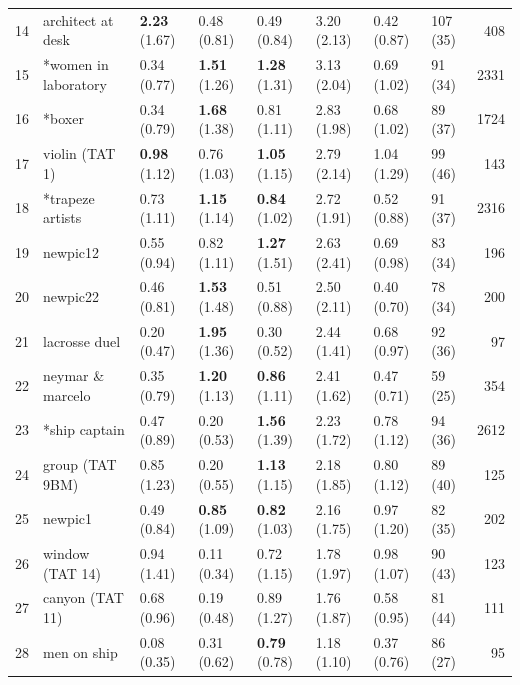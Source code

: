 \documentclass[jou,a4paper]{apa6}\usepackage[]{graphicx}\usepackage[]{color}
\begin{document}
\begin{table}
\begin{threeparttable}
\begin{tabularx}{\textwidth}{rlllllllr}
   14 & architect at desk & \textbf{2.23} (1.67) & 0.48 (0.81) & 0.49 (0.84) & 3.20 (2.13) & 0.42 (0.87) & 107 (35) & 408 \\ 
   15 & *women in laboratory & 0.34 (0.77) & \textbf{1.51} (1.26) & \textbf{1.28} (1.31) & 3.13 (2.04) & 0.69 (1.02) & 91 (34) & 2331 \\ 
   16 & *boxer & 0.34 (0.79) & \textbf{1.68} (1.38) & 0.81 (1.11) & 2.83 (1.98) & 0.68 (1.02) & 89 (37) & 1724 \\ 
   17 & violin (TAT 1) & \textbf{0.98} (1.12) & 0.76 (1.03) & \textbf{1.05} (1.15) & 2.79 (2.14) & 1.04 (1.29) & 99 (46) & 143 \\ 
   18 & *trapeze artists & 0.73 (1.11) & \textbf{1.15} (1.14) & \textbf{0.84} (1.02) & 2.72 (1.91) & 0.52 (0.88) & 91 (37) & 2316 \\ 
   19 & newpic12 & 0.55 (0.94) & 0.82 (1.11) & \textbf{1.27} (1.51) & 2.63 (2.41) & 0.69 (0.98) & 83 (34) & 196 \\ 
   20 & newpic22 & 0.46 (0.81) & \textbf{1.53} (1.48) & 0.51 (0.88) & 2.50 (2.11) & 0.40 (0.70) & 78 (34) & 200 \\ 
   21 & lacrosse duel & 0.20 (0.47) & \textbf{1.95} (1.36) & 0.30 (0.52) & 2.44 (1.41) & 0.68 (0.97) & 92 (36) &  97 \\ 
   22 & neymar \& marcelo & 0.35 (0.79) & \textbf{1.20} (1.13) & \textbf{0.86} (1.11) & 2.41 (1.62) & 0.47 (0.71) & 59 (25) & 354 \\ 
   23 & *ship captain & 0.47 (0.89) & 0.20 (0.53) & \textbf{1.56} (1.39) & 2.23 (1.72) & 0.78 (1.12) & 94 (36) & 2612 \\ 
   24 & group (TAT 9BM) & 0.85 (1.23) & 0.20 (0.55) & \textbf{1.13} (1.15) & 2.18 (1.85) & 0.80 (1.12) & 89 (40) & 125 \\ 
   25 & newpic1 & 0.49 (0.84) & \textbf{0.85} (1.09) & \textbf{0.82} (1.03) & 2.16 (1.75) & 0.97 (1.20) & 82 (35) & 202 \\ 
   26 & window (TAT 14) & 0.94 (1.41) & 0.11 (0.34) & 0.72 (1.15) & 1.78 (1.97) & 0.98 (1.07) & 90 (43) & 123 \\ 
   27 & canyon (TAT 11) & 0.68 (0.96) & 0.19 (0.48) & 0.89 (1.27) & 1.76 (1.87) & 0.58 (0.95) & 81 (44) & 111 \\ 
   28 & men on ship & 0.08 (0.35) & 0.31 (0.62) & \textbf{0.79} (0.78) & 1.18 (1.10) & 0.37 (0.76) & 86 (27) &  95 \\ 
   \hline


\end{tabularx}
\end{threeparttable}
\end{table}
\end{document}
